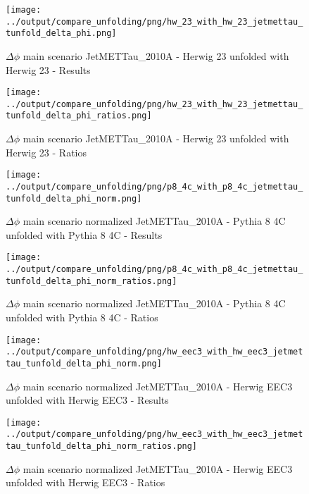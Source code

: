 \documentclass[11pt]{book}
\begin{document}
\begin{figure}[ht]
\centering
\texttt{[image: ../output/compare\_unfolding/png/hw\_23\_with\_hw\_23\_jetmettau\_tunfold\_delta\_phi.png]}
\caption{$\Delta\phi$ main scenario JetMETTau\_2010A - Herwig 23 unfolded with Herwig 23 - Results}
\label{hw_23_hw_23_jetmettau_tunfold_delta_phi_a}
\end{figure}

\begin{figure}[ht]
\centering
\texttt{[image: ../output/compare\_unfolding/png/hw\_23\_with\_hw\_23\_jetmettau\_tunfold\_delta\_phi\_ratios.png]}
\caption{$\Delta\phi$ main scenario JetMETTau\_2010A - Herwig 23 unfolded with Herwig 23 - Ratios}
\label{hw_23_jetmettau_tunfold_delta_phi_b}
\end{figure}


\begin{figure}[ht]
\centering
\texttt{[image: ../output/compare\_unfolding/png/p8\_4c\_with\_p8\_4c\_jetmettau\_tunfold\_delta\_phi\_norm.png]}
\caption{$\Delta\phi$ main scenario normalized JetMETTau\_2010A - Pythia 8 4C unfolded with Pythia 8 4C - Results}
\label{p8_p8_jetmettau_tunfold_delta_phi_norm_a}
\end{figure}

\begin{figure}[ht]
\centering
\texttt{[image: ../output/compare\_unfolding/png/p8\_4c\_with\_p8\_4c\_jetmettau\_tunfold\_delta\_phi\_norm\_ratios.png]}
\caption{$\Delta\phi$ main scenario normalized JetMETTau\_2010A - Pythia 8 4C unfolded with Pythia 8 4C - Ratios}
\label{p8_p8_jetmettau_tunfold_delta_phi_norm_b}
\end{figure}

\begin{figure}[ht]
\centering
\texttt{[image: ../output/compare\_unfolding/png/hw\_eec3\_with\_hw\_eec3\_jetmettau\_tunfold\_delta\_phi\_norm.png]}
\caption{$\Delta\phi$ main scenario normalized JetMETTau\_2010A - Herwig EEC3 unfolded with Herwig EEC3 - Results}
\label{hw_eec3_hw_eec3_jetmettau_tunfold_delta_phi_norm_a}
\end{figure}

\begin{figure}[ht]
\centering
\texttt{[image: ../output/compare\_unfolding/png/hw\_eec3\_with\_hw\_eec3\_jetmettau\_tunfold\_delta\_phi\_norm\_ratios.png]}
\caption{$\Delta\phi$ main scenario normalized JetMETTau\_2010A - Herwig EEC3 unfolded with Herwig EEC3 - Ratios}
\label{hw_eec3_jetmettau_tunfold_delta_phi_norm_b}
\end{figure}
\end{document}
